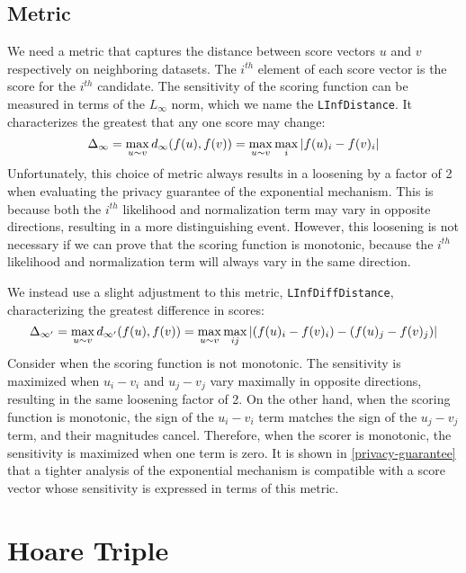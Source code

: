 \documentclass{article}
\begin{document}
\subsection{Metric}
We need a metric that captures the distance between score vectors $u$ and $v$ respectively on neighboring datasets. 
The $i^{th}$ element of each score vector is the score for the $i^{th}$ candidate.
The sensitivity of the scoring function can be measured in terms of the $L_\infty$ norm, which we name the \texttt{LInfDistance}. 
It characterizes the greatest that any one score may change:
\begin{equation}
    \Delta_{\infty} = \max_{u \sim v} d_{\infty}(f(u), f(v)) = \max\limits_{u \sim v} \max\limits_{i} \abs{f(u)_i - f(v)_i}
\end{equation}
Unfortunately, this choice of metric always results in a loosening by a factor of 2 when evaluating the privacy guarantee of the exponential mechanism.
This is because both the $i^{th}$ likelihood and normalization term may vary in opposite directions, resulting in a more distinguishing event.
However, this loosening is not necessary if we can prove that the scoring function is monotonic, because the $i^{th}$ likelihood and normalization term will always vary in the same direction.

We instead use a slight adjustment to this metric, \texttt{LInfDiffDistance}, characterizing the greatest difference in scores:
\begin{equation}
    \Delta_{\infty'} = \max_{u \sim v} d_{\infty'}(f(u), f(v)) = \max\limits_{u \sim v} \max\limits_{ij} \abs{(f(u)_i - f(v)_i) - (f(u)_j - f(v)_j)}
\end{equation}
Consider when the scoring function is not monotonic.
The sensitivity is maximized when $u_i - v_i$ and $u_j - v_j$ vary maximally in opposite directions, resulting in the same loosening factor of 2.
On the other hand, when the scoring function is monotonic, the sign of the $u_i - v_i$ term matches the sign of the $u_j - v_j$ term,
and their magnitudes cancel.
Therefore, when the scorer is monotonic, the sensitivity is maximized when one term is zero. 
It is shown in \ref{privacy-guarantee} that a tighter analysis of the exponential mechanism is compatible with a score vector whose sensitivity is expressed in terms of this metric.



\section{Hoare Triple}
\end{document}

